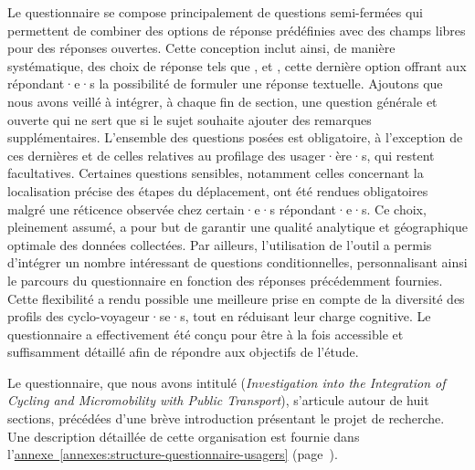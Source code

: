 \begin{refsegment}
Le questionnaire se compose principalement de questions semi-fermées qui permettent de combiner des options de réponse prédéfinies avec des champs libres pour des réponses ouvertes. Cette conception inclut ainsi, de manière systématique, des choix de réponse tels que ,  et , cette dernière option offrant aux répondant·e·s la possibilité de formuler une réponse textuelle. Ajoutons que nous avons veillé à intégrer, à chaque fin de section, une question générale et ouverte qui ne sert que si le sujet souhaite ajouter des remarques supplémentaires. L’ensemble des questions posées est obligatoire, à l’exception de ces dernières et de celles relatives au profilage des usager·ère·s, qui restent facultatives. Certaines questions sensibles, notamment celles concernant la localisation précise des étapes du déplacement, ont été rendues obligatoires malgré une réticence observée chez certain·e·s répondant·e·s. Ce choix, pleinement assumé, a pour but de garantir une qualité analytique et géographique optimale des données collectées. Par ailleurs, l’utilisation de l’outil  a permis d’intégrer un nombre intéressant de questions conditionnelles, personnalisant ainsi le parcours du questionnaire en fonction des réponses précédemment fournies. Cette flexibilité a rendu possible une meilleure prise en compte de la diversité des profils des cyclo-voyageur·se·s, tout en réduisant leur charge cognitive. Le questionnaire a effectivement été conçu pour être à la fois accessible et suffisamment détaillé afin de répondre aux objectifs de l’étude.%

Le questionnaire, que nous avons intitulé  (\textsl{Investigation into the Integration of Cycling and Micromobility with Public Transport}), s'articule autour de huit sections, précédées d'une brève introduction présentant le projet de recherche. Une description détaillée de cette organisation est fournie dans l'\hyperref[annexes:structure-questionnaire-usagers]{annexe~\ref{annexes:structure-questionnaire-usagers}} (page~\pageref{annexes:structure-questionnaire-usagers}).%


\end{refsegment}
